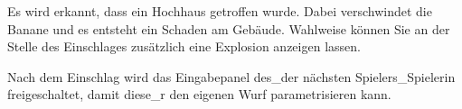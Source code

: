 Es wird erkannt, dass ein Hochhaus getroffen wurde. Dabei verschwindet die Banane und es entsteht ein Schaden am Gebäude. Wahlweise können Sie an der Stelle des Einschlages zus\"atzlich eine Explosion anzeigen lassen.

Nach dem Einschlag wird das Eingabepanel des\_der nächsten Spielers\_Spielerin freigeschaltet, damit diese\_r den eigenen Wurf parametrisieren kann.